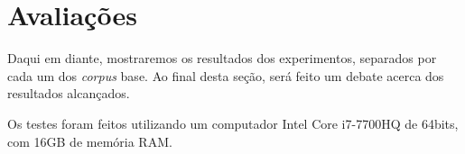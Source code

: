 \section{Avaliações}
\label{sec:resultados}
Daqui em diante, mostraremos os resultados dos experimentos, separados por cada um dos \textit{corpus} base. Ao final desta seção, será feito um debate acerca dos resultados alcançados.

Os testes foram feitos utilizando um computador Intel Core i7-7700HQ de 64bits, com 16GB de memória RAM.


